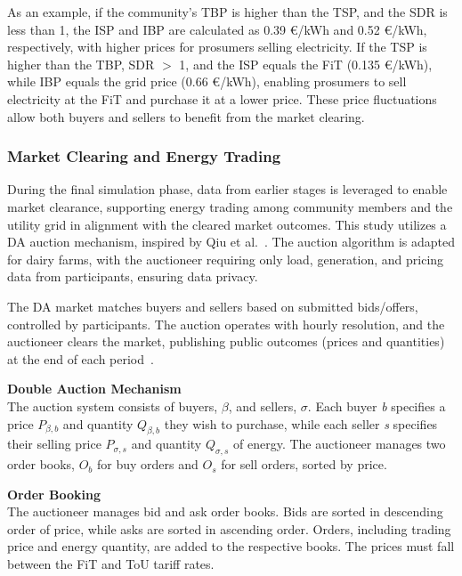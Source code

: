 \documentclass[preprint,12pt]{elsarticle}
\begin{document}
As an example, if the community’s TBP is higher than the TSP, and the SDR is less than 1, the ISP and IBP are calculated as 0.39 €/kWh and 0.52 €/kWh, respectively, with higher prices for prosumers selling electricity. If the TSP is higher than the TBP, SDR $>$ 1, and the ISP equals the FiT (0.135 €/kWh), while IBP equals the grid price (0.66 €/kWh), enabling prosumers to sell electricity at the FiT and purchase it at a lower price. These price fluctuations allow both buyers and sellers to benefit from the market clearing.





\subsubsection{Market Clearing and Energy Trading}


During the final simulation phase, data from earlier stages is leveraged to enable market clearance, supporting energy trading among community members and the utility grid in alignment with the cleared market outcomes. This study utilizes a DA auction mechanism, inspired by Qiu et al.~\cite{qiu2022mean, qiu2021multi}. The auction algorithm is adapted for dairy farms, with the auctioneer requiring only load, generation, and pricing data from participants, ensuring data privacy.

The DA market matches buyers and sellers based on submitted bids/offers, controlled by participants. The auction operates with hourly resolution, and the auctioneer clears the market, publishing public outcomes (prices and quantities) at the end of each period~\cite{qiu2022mean}.

\textbf{Double Auction Mechanism}\\
The auction system consists of buyers, $\beta$, and sellers, $\sigma$. Each buyer \textit{b} specifies a price $P_{\beta,b}$ and quantity $Q_{\beta,b}$ they wish to purchase, while each seller \textit{s} specifies their selling price $P_{\sigma,s}$ and quantity $Q_{\sigma,s}$ of energy. The auctioneer manages two order books, $O_b$ for buy orders and $O_s$ for sell orders, sorted by price.

\textbf{Order Booking}\\
The auctioneer manages bid and ask order books. Bids are sorted in descending order of price, while asks are sorted in ascending order. Orders, including trading price and energy quantity, are added to the respective books. The prices must fall between the FiT and ToU tariff rates.
\end{document}
